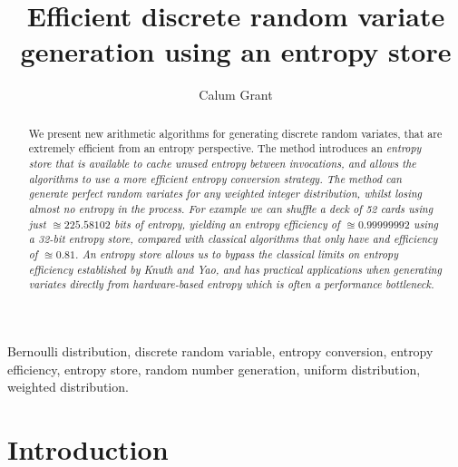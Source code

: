 \documentclass[lettersize,onecolumn]{IEEEtran}
\begin{document}
\title{Efficient discrete random variate generation using an entropy store}
\author{Calum Grant}



\maketitle

\begin{abstract}
    We present new arithmetic algorithms for generating discrete random variates, that are extremely efficient from an entropy perspective.
    The method introduces an \em entropy store \em that is available to cache unused entropy between invocations, and allows the algorithms to use a more efficient entropy conversion strategy.
    The method can generate perfect random variates for any weighted integer distribution, whilst losing almost no entropy in the process. 
    For example we can shuffle a deck of 52 cards using just $\approxeq 225.58102$ bits of entropy, yielding an entropy  efficiency of $\approxeq 0.99999992$ using a 32-bit entropy store, compared with classical algorithms that only have and efficiency of $\approxeq 0.81$. An entropy store allows us to bypass the classical limits on entropy efficiency established by Knuth and Yao, and has practical applications when generating variates directly from hardware-based entropy which is often a performance bottleneck.    
\end{abstract}

\begin{IEEEkeywords}
    Bernoulli distribution, discrete random variable, entropy conversion, entropy efficiency, entropy store, random number generation, uniform distribution, weighted distribution.
\end{IEEEkeywords}

\section{Introduction}
\end{document}
